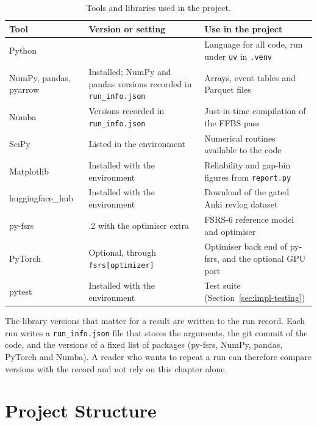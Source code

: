 \begin{table}[htbp]
  \centering
  \caption{Tools and libraries used in the project.}
  \label{tab:tools}
  \begin{tabular}{@{}>{\raggedright\arraybackslash}p{3.6cm}>{\raggedright\arraybackslash}p{4.4cm}>{\raggedright\arraybackslash}p{5.8cm}@{}}
    \toprule
    \textbf{Tool} & \textbf{Version or setting} & \textbf{Use in the project}\\
    \midrule
    Python & 3.12 & Language for all code, run under \texttt{uv} in \texttt{.venv}\\
    NumPy, pandas, pyarrow & Installed; NumPy and pandas versions recorded in \texttt{run\_info.json} & Arrays, event tables and Parquet files\\
    Numba & Versions recorded in \texttt{run\_info.json} & Just-in-time compilation of the FFBS pass \cite{lam2015numba}\\
    SciPy & Listed in the environment & Numerical routines available to the code\\
    Matplotlib & Installed with the environment & Reliability and gap-bin figures from \texttt{report.py}\\
    huggingface\_hub & Installed with the environment & Download of the gated Anki revlog dataset \cite{ankirevlogs10k}\\
    py-fsrs & 6.3.2 with the optimiser extra & FSRS-6 reference model and optimiser \cite{pyfsrs}\\
    PyTorch & Optional, through \texttt{fsrs[optimizer]} & Optimiser back end of py-fsrs, and the optional GPU port\\
    pytest & Installed with the environment & Test suite (Section~\ref{sec:impl-testing})\\
    \bottomrule
  \end{tabular}
\end{table}

The library versions that matter for a result are written to the run record. Each run writes a
\texttt{run\_info.json} file that stores the arguments, the git commit of the code, and the versions
of a fixed list of packages (py-fsrs, NumPy, pandas, PyTorch and Numba). A reader who wants to repeat a run can therefore compare
versions with the record and not rely on this chapter alone.

\section{Project Structure}
\label{sec:impl-structure}

